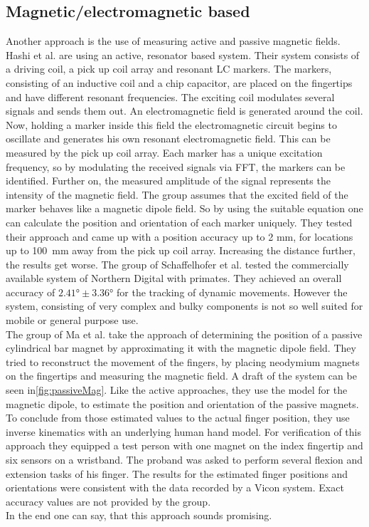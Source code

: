 \subsection{Magnetic/electromagnetic based} \label{subsec:approaches:magnetic}
Another approach is the use of measuring active and passive magnetic fields.\\
Hashi et al. are using an active, resonator based system. Their system consists of a driving coil, a pick up coil array and resonant LC markers. The markers, consisting of an inductive coil and a chip capacitor, are placed on the fingertips and have different resonant frequencies. The exciting coil modulates several signals and sends them out. An electromagnetic field is generated around the coil. Now, holding a marker inside this field the electromagnetic circuit begins to oscillate and generates his own resonant electromagnetic field. This can be measured by the pick up coil array. Each marker has a unique excitation frequency, so by modulating the received signals via FFT, the markers can be identified. Further on, the measured amplitude of the signal represents the intensity of the magnetic field. The group assumes that the excited field of the marker behaves like a magnetic dipole field. So by using the suitable equation  one can calculate the position and orientation of each marker uniquely. They tested their approach and came up with a position accuracy up to 2 mm, for locations up to \SI{100}{mm} away from the pick up coil array. Increasing the distance further, the results get worse. The group of Schaffelhofer et al. tested the commercially available system of Northern Digital \cite{wave} with primates. They achieved an overall accuracy of $ \ang{2.41} \pm \ang{3.36} $ for the tracking of dynamic movements. However the system, consisting of very complex and bulky components is not so well suited for mobile or general purpose use.\\
The group of Ma et al. take the approach of determining the position of a passive cylindrical bar magnet by approximating it with the magnetic dipole field. They tried to reconstruct the movement of the fingers, by placing neodymium magnets on the fingertips and measuring the magnetic field. A draft of the system can be seen in\ref{fig:passiveMag}. Like the active approaches, they use the model for the magnetic dipole, to estimate the position and orientation of the passive magnets. To conclude from those estimated values to the actual finger position, they use inverse kinematics with an underlying human hand model. For verification of this approach they equipped a test person with one magnet on the index fingertip and six sensors on a wristband. The proband was asked to perform several flexion and extension tasks of his finger. The results for the estimated finger positions and orientations were consistent with the data recorded by a Vicon system. Exact accuracy values are not provided by the group.\\
In the end one can say, that this approach sounds promising. 


